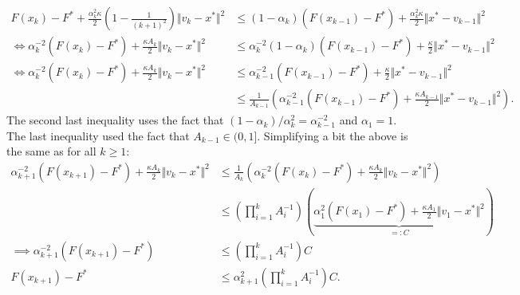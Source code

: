 \documentclass[12pt]{article}
\begin{document}
        {\footnotesize
        \begin{align*}
            F(x_k) - F^* +
            \frac{\alpha_k^2\kappa}{2}\left(
                1 - \frac{1}{(k + 1)^2}
            \right)
            \Vert v_k - x^*\Vert^2
            &\le 
            (1 - \alpha_k)(F(x_{k - 1}) - F^*)
            + 
            \frac{\alpha_k^2\kappa}{2}
            \Vert x^* - v_{k - 1}\Vert^2
            \\
            \iff 
            \alpha_k^{-2}(F(x_k) - F^*)
            + 
            \frac{\kappa A_k}{2}\Vert v_k - x^*\Vert^2
            &\le 
            \alpha_k^{-2}(1 - \alpha_k)(F(x_{k - 1}) - F^*)
            + 
            \frac{\kappa}{2}
            \Vert x^* - v_{k - 1}\Vert^2
            \\
            \iff
            \alpha_k^{-2}(F(x_k) - F^*)
            + 
            \frac{\kappa A_k}{2}\Vert v_k - x^*\Vert^2
            &\le 
            \alpha_{k - 1}^{-2}(F(x_{k - 1}) - F^*)
            + 
            \frac{\kappa}{2}
            \Vert x^* - v_{k - 1}\Vert^2
            \\
            & \le 
            \frac{1}{A_{k - 1}}\left(
                \alpha_{k - 1}^{-2}(F(x_{k - 1}) - F^*)
                + 
                \frac{\kappa A_{k - 1}}{2}
                \Vert x^* - v_{k - 1}\Vert^2
            \right). 
        \end{align*}
        }
        The second last inequality uses the fact that $(1 - \alpha_k)/\alpha_k^2 = \alpha_{k - 1}^{-2}$ and $\alpha_1 = 1$. 
        The last inequality used the fact that $A_{k - 1} \in (0, 1]$. 
        Simplifying a bit the above is the same as for all $k\ge 1$: 
        \begin{align*}
            \alpha_{k + 1}^{-2}(F(x_{k + 1}) - F^*) 
            + \frac{\kappa A_k}{2}\Vert v_k - x^*\Vert^2
            &\le 
            \frac{1}{A_k}\left(
                \alpha_k^{-2}(F(x_k) - F^*) + \frac{\kappa A_k}{2}\Vert v_{k} - x^*\Vert^2
            \right)
            \\
            & \le
            \left(
                \prod_{i = 1}^k A_i^{-1}
            \right)\left(
                \underbrace{
                    \alpha_1^2 (F(x_1) - F^*) + \frac{\kappa A_1}{2}\Vert v_1 - x^*\Vert^2
                }
                _{=:C}
            \right)
            \\
            \implies 
            \alpha_{k + 1}^{-2}(F(x_{k + 1}) - F^*)
            &\le 
            \left(
                \prod_{i = 1}^k A_i^{-1}
            \right) C
            \\
            F(x_{k + 1}) - F^* 
            &\le 
            \alpha_{k + 1}^2\left(
                \prod_{i = 1}^k A_i^{-1}
            \right) C. 
        \end{align*}
\end{document}
